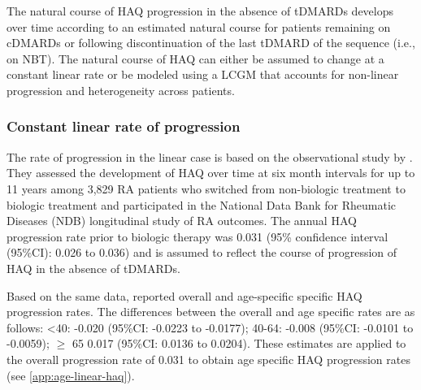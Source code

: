 \documentclass[11pt,final,fleqn]{article}\usepackage[]{graphicx}\usepackage[]{color}
\theoremstyle{plain}
\begin{document}
The natural course of HAQ progression in the absence of tDMARDs develops over time according to an estimated natural course for patients remaining on cDMARDs or following discontinuation of the last tDMARD of the sequence (i.e., on NBT). The natural course of HAQ can either be assumed to change at a constant linear rate or be modeled using a LCGM that accounts for non-linear progression and heterogeneity across patients. 

\subsubsection{Constant linear rate of progression} \label{sec:haq-linear-rate}
The rate of progression in the linear case is based on the observational study by \citet{wolfe2010loss}. They assessed the development of HAQ over time at six month intervals for up to 11 years among 3,829 RA patients who switched from non-biologic treatment to biologic treatment and participated in the National Data Bank for Rheumatic Diseases (NDB) longitudinal study of RA outcomes. The annual HAQ progression rate prior to biologic therapy was 0.031 (95\% confidence interval (95\%CI): 0.026 to 0.036) and is assumed to reflect the course of progression of HAQ in the absence of tDMARDs.

Based on the same data, \citet{michaud2011treatment} reported overall and age-specific specific HAQ progression rates. The differences between the overall and age specific rates are as follows: \textless{}40: -0.020 (95\%CI: -0.0223 to -0.0177); 40-64: -0.008 (95\%CI: -0.0101 to -0.0059); \(\geq\) 65 0.017 (95\%CI: 0.0136 to 0.0204). These estimates are applied to the overall progression rate of 0.031 to obtain age specific HAQ progression rates (see \autoref{app:age-linear-haq}).
\end{document}
